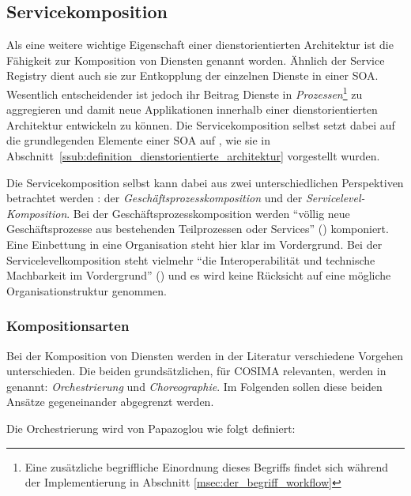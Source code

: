 
\subsection{Servicekomposition} %
\label{sub:service_komposition}

  Als eine weitere wichtige Eigenschaft einer dienstorientierten Architektur ist die Fähigkeit zur Komposition von Diensten genannt worden. Ähnlich der Service Registry dient auch sie zur Entkopplung der einzelnen Dienste in einer SOA. Wesentlich entscheidender ist jedoch ihr Beitrag Dienste in \emph{Prozessen}\footnote{Eine zusätzliche begriffliche Einordnung dieses Begriffs findet sich während der Implementierung in Abschnitt \ref{msec:der_begriff_workflow}} zu aggregieren und damit neue Applikationen innerhalb einer dienstorientierten Architektur entwickeln zu können. Die Servicekomposition selbst setzt dabei auf die grundlegenden Elemente einer SOA auf \citep[S. 51]{milanovic2004csw}, wie sie in Abschnitt~\ref{ssub:definition_dienstorientierte_architektur} vorgestellt wurden.
    
  Die Servicekomposition selbst kann dabei aus zwei unterschiedlichen Perspektiven betrachtet werden \citep[S. 104]{masak2007ssb}: der \emph{Geschäftsprozesskomposition} und der \emph{Servicelevel-Komposition}. Bei der Geschäftsprozesskomposition werden "`völlig neue Geschäftsprozesse aus bestehenden Teilprozessen oder Services"' (\citep[S. 104]{masak2007ssb}) komponiert. Eine Einbettung in eine Organisation steht hier klar im Vordergrund. Bei der Servicelevelkomposition steht vielmehr "`die Interoperabilität und technische Machbarkeit im Vordergrund"' (\citep[S. 105]{masak2007ssb}) und es wird keine Rücksicht auf eine mögliche Organisationstruktur genommen.
  
\subsubsection{Kompositionsarten} %
\label{ssub:kompositionsarten}

  Bei der Komposition von Diensten werden in der Literatur verschiedene Vorgehen unterschieden. Die beiden grundsätzlichen, für COSIMA relevanten, werden in \citep[S. 41]{papazoglou2007soc} genannt: \emph{Orchestrierung} und \emph{Choreographie}. Im Folgenden sollen diese beiden Ansätze gegeneinander abgegrenzt werden.
  
  Die Orchestrierung wird von Papazoglou wie folgt definiert:
  
